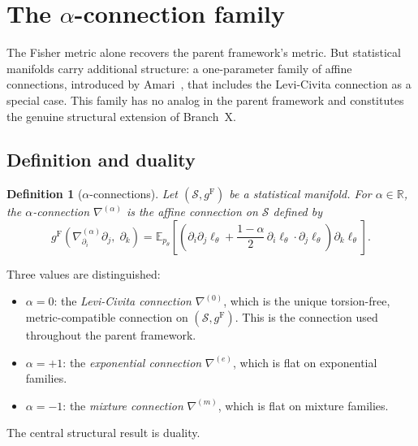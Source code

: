 \documentclass[11pt]{article}
\newcommand{\E}{\mathbb{E}}
\newcommand{\RR}{\mathbb{R}}
\newcommand{\gF}{g^{\mathrm{F}}}
\newtheorem{definition}{Definition}
\theoremstyle{remark}
\begin{document}
\section{The \texorpdfstring{$\alpha$}{alpha}-connection family}
\label{sec:alpha-connections}

The Fisher metric alone recovers the parent framework's metric.  But
statistical manifolds carry additional structure: a one-parameter family of
affine connections, introduced by Amari~\cite{amari1985}, that includes the
Levi-Civita connection as a special case.  This family has no analog in the
parent framework and constitutes the genuine structural extension of Branch~X.

\subsection{Definition and duality}

\begin{definition}[$\alpha$-connections]\label{def:alpha-connection}
Let $(\mathcal{S}, \gF)$ be a statistical manifold.  For $\alpha \in \RR$, the
\emph{$\alpha$-connection} $\nabla^{(\alpha)}$ is the affine connection on
$\mathcal{S}$ defined by
\begin{equation}\label{eq:alpha-connection}
\gF\!\left(\nabla^{(\alpha)}_{\partial_i} \partial_j,\; \partial_k\right)
= \E_{p_\theta}\!\left[\left(\partial_i \partial_j \ell_\theta
+ \frac{1-\alpha}{2}\, \partial_i \ell_\theta \cdot
\partial_j \ell_\theta\right) \partial_k \ell_\theta\right].
\end{equation}
\end{definition}

Three values are distinguished:
\begin{itemize}
  \item $\alpha = 0$: the \emph{Levi-Civita connection} $\nabla^{(0)}$, which
  is the unique torsion-free, metric-compatible connection on
  $(\mathcal{S}, \gF)$.  This is the connection used throughout the parent
  framework.
  \item $\alpha = +1$: the \emph{exponential connection} $\nabla^{(e)}$, which
  is flat on exponential families.
  \item $\alpha = -1$: the \emph{mixture connection} $\nabla^{(m)}$, which is
  flat on mixture families.
\end{itemize}

The central structural result is duality.
\end{document}
